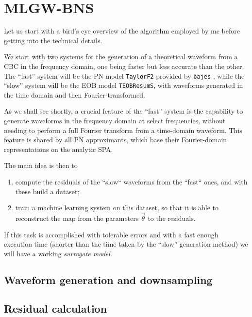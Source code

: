 \documentclass[main.tex]{subfiles}
\begin{document}
\section{MLGW-BNS}

Let us start with a bird's eye overview of the algorithm employed by \ac{mc} before getting into the technical details. 

We start with two systems for the generation of a theoretical waveform from a \ac{CBC} in the frequency domain, one being faster but less accurate than the other. 
The ``fast'' system will be the \ac{PN} model \texttt{TaylorF2} provided by \texttt{bajes} \cite[]{breschiTtBajesBayesian2021}, while the ``slow'' system will be the \ac{EOB} model \texttt{TEOBResumS}, with waveforms generated in the time domain and then Fourier-transformed. 

As we shall see shortly, a crucial feature of the ``fast'' system is the capability to generate waveforms in the frequency domain at select frequencies, without needing to perform a full Fourier transform from a time-domain waveform.
This feature is shared by all \ac{PN} approximants, which base their Fourier-domain representations on the analytic \ac{SPA}.

The main idea is then to 
\begin{enumerate}
    \item compute the residuals of the ``slow`` waveforms from the ``fast`` ones, and with these build a dataset;
    \item train a machine learning system on this dataset, so that it is able to reconstruct the map from the parameters \(\vec{\theta}\) to the residuals.
\end{enumerate}

If this task is accomplished with tolerable errors and with a fast enough execution time (shorter than the time taken by the ``slow'' generation method) we will have a working \emph{surrogate model}. 

\subsection{Waveform generation and downsampling}



\subsection{Residual calculation} \label{sec:residuals}
\end{document}
